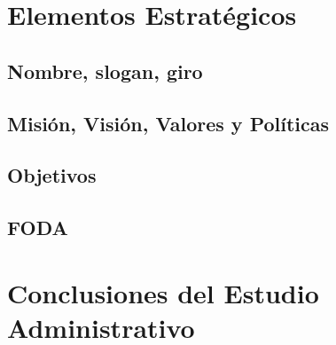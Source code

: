 \section{Elementos Estratégicos}

	\subsection{Nombre, slogan, giro}
	
	\subsection{Misión, Visión, Valores y Políticas}
	
	\subsection{Objetivos}
	
	\subsection{FODA}
	
\section{Conclusiones del Estudio Administrativo}

